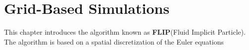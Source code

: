 \chapter{Grid-Based Simulations}
\label{chapter grid}

This chapter introduces the algorithm known as \textbf{FLIP}(Fluid Implicit Particle). The algorithm is based on a spatial discretization of the Euler equations 
